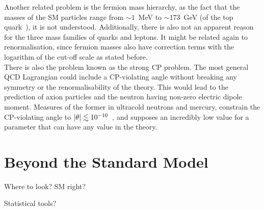 Another related problem is the fermion mass hierarchy, as the fact that the masses of the SM particles range from $\sim1$~MeV to $\sim$173~GeV (of the top quark~\cite{pdg}), it is not understood. Additionally, there is also not an apparent reason for the three mass families of quarks and leptons. It might be related again to renormalisation, since fermion masses also have correction terms with the logarithm of the cut-off scale as stated before.\\

There is also the problem known as the strong CP problem. The most general QCD Lagrangian could include a CP-violating angle without breaking any symmetry or the renormalisability of the theory. This would lead to the prediction of axion particles and the neutron having non-zero electric dipole moment. Measures of the former in ultracold neutrons and mercury, constrain the CP-violating angle to $\abs{\theta}\lesssim10^{-10}$~\cite{}, and supposes an incredibly low value for a parameter that can have any value in the theory.

\section{Beyond the Standard Model}


Where to look? SM right?

Statistical tools?